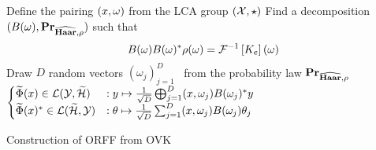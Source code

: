 \begin{center}
\begin{algorithm2e}[H]\label{alg:ORFF_construction}
	\SetAlgoLined
    \BlankLine
	Define the pairing $(x, \omega)$ from the \acs{LCA} group $(\mathcal{X}, \star)$\;
	Find a decomposition $(B(\omega),{\mathbf{{Pr}}}_{\widehat{\mathbf{Haar}},\rho})$ such that
    \begin{dmath*}
    B(\omega)B(\omega)^\adjoint \rho(\omega)=\IFT{K_e}(\omega)\text{\;}
    \end{dmath*}
	\nl Draw $D$ random vectors $(\omega_j)_{j=1}^D$ \iid~from the probability law ${\mathbf{{Pr}}}_{\widehat{\mathbf{Haar}},\rho}$\;
    \nl \Return $\begin{cases}\widetilde{\Phi}(x)\in\mathcal{L}(\mathcal{Y},\widetilde{\mathcal{H}}) &:  y \mapsto \frac{1}{\sqrt{D}}\operatorname*{\bigoplus}_{j=1}^D(x, \omega_j)B(\omega_j)^* y \\ \widetilde{\Phi}(x)^* \in\mathcal{L}(\widetilde{\mathcal{H}}, \mathcal{Y}) &: \theta \mapsto \frac{1}{\sqrt{D}} \sum_{j=1}^D (x, \omega_j)B(\omega_j)\theta_j \end{cases}$\;
    \caption{Construction of \acs{ORFF} from \acs{OVK}}
\end{algorithm2e}
\end{center}


